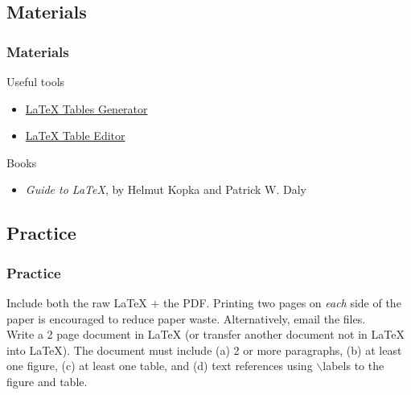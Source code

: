 \documentclass[slidestop,compress,mathserif]{beamer}
\begin{document}

\subsection[Materials]{Materials}
\begin{frame} 
		\frametitle{Materials}

		Useful tools
		\begin{itemize}
			\item \href{http://www.tablesgenerator.com/latex_tables}{LaTeX Tables Generator}
			\item \href{http://truben.no/table/}{LaTeX Table Editor}
		\end{itemize}
		Books
		\begin{itemize}
			\item \emph{Guide to LaTeX}, by Helmut Kopka and Patrick W. Daly
		\end{itemize}				
		
\end{frame}

\subsection[Practice]{Practice}
\begin{frame}
		\frametitle{Practice}
		
	Include both the raw LaTeX $+$ the PDF. Printing two pages on \emph{each} side of the paper is encouraged to reduce paper waste. Alternatively, email the files. \\[5mm]

	Write a 2 page document in LaTeX (or transfer another document not in LaTeX into LaTeX). The document must include (a) 2 or more paragraphs, (b) at least one figure, (c) at least one table, and (d) text references using {\color{command}$\backslash$label}s to the figure and table.
	
\end{frame}
\end{document}
